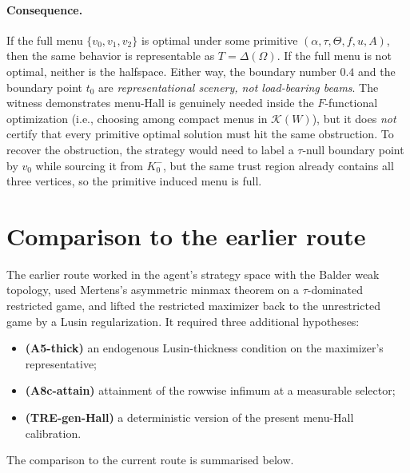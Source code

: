 \documentclass[11pt]{article}
\theoremstyle{definition}
\theoremstyle{remark}
\newcommand{\Om}{\Omega}
\begin{document}
\paragraph{Consequence.} If the full menu $\{v_0, v_1, v_2\}$ is
optimal under some primitive $(\alpha, \tau, \Theta, f, u, A)$, then
the same behavior is representable as $T = \Delta(\Om)$. If the full
menu is not optimal, neither is the halfspace. Either way, the
boundary number $0.4$ and the boundary point $t_0$ are
\emph{representational scenery, not load-bearing beams}. The witness
demonstrates menu-Hall is genuinely needed inside the
$F$-functional optimization (i.e., choosing among compact menus in
$\mathcal K(W)$), but it does \emph{not} certify that every primitive
optimal solution must hit the same obstruction. To recover the
obstruction, the strategy would need to label a $\tau$-null boundary
point by $v_0$ while sourcing it from $K_0^-$, but the same trust
region already contains all three vertices, so the primitive induced
menu is full.

\section{Comparison to the earlier route}\label{sec:comparison}

The earlier route worked in the agent's strategy space with the
Balder weak topology, used Mertens's asymmetric minmax theorem on a
$\tau$-dominated restricted game, and lifted the restricted maximizer
back to the unrestricted game by a Lusin regularization. It required
three additional hypotheses:
\begin{itemize}[leftmargin=2em]
\item \textbf{(A5-thick)} an endogenous Lusin-thickness condition on
the maximizer's representative;
\item \textbf{(A8c-attain)} attainment of the rowwise infimum at a
measurable selector;
\item \textbf{(TRE-gen-Hall)} a deterministic version of the present
menu-Hall calibration.
\end{itemize}
The comparison to the current route is summarised below.
\end{document}
